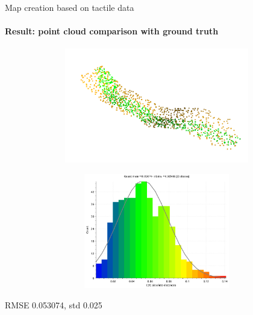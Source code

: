 \documentclass[aspectratio=169]{beamer}
\begin{document}
\begin{frame}[t]{Map creation based on tactile data}
    \framesubtitle{Result: point cloud comparison with ground truth}
    \vspace{-15pt}
    \begin{figure}[H]
        \begin{subfigure}{0.49\textwidth}
            \centering\includegraphics[height=5cm,width=1\textwidth,keepaspectratio]{cropped_pcd.png}
        \end{subfigure}
        \begin{subfigure}{0.49\textwidth}
            \centering\includegraphics[height=5cm,width=1\textwidth,keepaspectratio]{pcd_hist.png}
        \end{subfigure}
    \end{figure}
    \alert{\Large RMSE 0.053074, std 0.025}
\end{frame}
\end{document}
